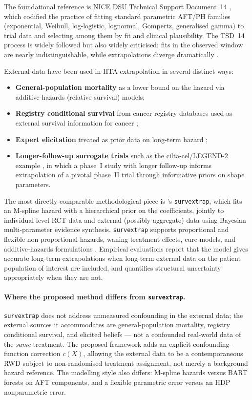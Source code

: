 \documentclass[11pt]{article}
\newcommand{\X}{X}
\newcommand{\cf}{c}
\begin{document}
The foundational reference is NICE DSU Technical Support Document~14
\citep{Latimer2013}, which codified the practice of fitting standard
parametric AFT/PH families (exponential, Weibull, log-logistic, lognormal,
Gompertz, generalised gamma) to trial data and selecting among them by
fit and clinical plausibility. The TSD~14 process is widely followed but
also widely criticised: fits in the observed window are nearly
indistinguishable, while extrapolations diverge dramatically
\citep{BellGorrod2019, Bagust2014}.

External data have been used in HTA extrapolation in several distinct ways:
\begin{itemize}[leftmargin=*]
  \item \textbf{General-population mortality} as a lower bound on the
        hazard via additive-hazards (relative survival) models;
  \item \textbf{Registry conditional survival} from cancer registry
        databases used as external survival information for cancer
        \citep{Guyot2017};
  \item \textbf{Expert elicitation} treated as prior data on long-term hazard
        \citep{Guyot2017};
  \item \textbf{Longer-follow-up surrogate trials} such as the
        cilta-cel/LEGEND-2 example \citep{Vyas2023}, in which a phase~I
        study with longer follow-up informs extrapolation of a pivotal
        phase~II trial through informative priors on shape parameters.
\end{itemize}

The most directly comparable methodological piece is \citet{Jackson2023}'s
\texttt{survextrap}, which fits an M-spline hazard with a hierarchical prior
on the coefficients, jointly to individual-level RCT data and external
(possibly aggregate) data using Bayesian multi-parameter evidence synthesis.
\texttt{survextrap} supports proportional and flexible non-proportional
hazards, waning treatment effects, cure models, and additive-hazards
formulations \citep{Jackson2023}. Empirical evaluations
\citep{Timmins2025} report that the model gives accurate long-term
extrapolations when long-term external data on the patient population of
interest are included, and quantifies structural uncertainty appropriately
when they are not.

\paragraph{Where the proposed method differs from \texttt{survextrap}.}
\texttt{survextrap} does not address unmeasured confounding in the external
data; the external sources it accommodates are general-population mortality,
registry conditional survival, and elicited beliefs --- not a confounded
real-world data of the \emph{same} treatment. The proposed framework
adds an explicit confounding-function correction $\cf(\X)$, allowing the
external data to be a contemporaneous RWD subject to non-randomised
treatment assignment, not merely a background hazard reference. The
modelling style also differs: M-spline hazards versus BART forests on
AFT components, and a flexible parametric error versus an HDP nonparametric
error.
\end{document}
